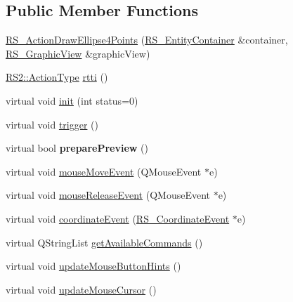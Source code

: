 \subsection*{Public Member Functions}
\begin{DoxyCompactItemize}
\item 
\hyperlink{classRS__ActionDrawEllipse4Points_a68fac043b7bac85718ad61d97c9fea09}{R\-S\-\_\-\-Action\-Draw\-Ellipse4\-Points} (\hyperlink{classRS__EntityContainer}{R\-S\-\_\-\-Entity\-Container} \&container, \hyperlink{classRS__GraphicView}{R\-S\-\_\-\-Graphic\-View} \&graphic\-View)
\item 
\hyperlink{classRS2_afe3523e0bc41fd637b892321cfc4b9d7}{R\-S2\-::\-Action\-Type} \hyperlink{classRS__ActionDrawEllipse4Points_af0df132883d06de0b37e8827175603d7}{rtti} ()
\item 
virtual void \hyperlink{classRS__ActionDrawEllipse4Points_a6df225bb21a5d390207c359cc149db81}{init} (int status=0)
\item 
virtual void \hyperlink{classRS__ActionDrawEllipse4Points_ac181ac7568c462d080c210ffc27c0706}{trigger} ()
\item 
\hypertarget{classRS__ActionDrawEllipse4Points_a1d4ae09ed24ce09570a1c3f81fe836c5}{virtual bool {\bfseries prepare\-Preview} ()}\label{classRS__ActionDrawEllipse4Points_a1d4ae09ed24ce09570a1c3f81fe836c5}

\item 
virtual void \hyperlink{classRS__ActionDrawEllipse4Points_a2bb8a25ac5a15412d816bedc52bbac9b}{mouse\-Move\-Event} (Q\-Mouse\-Event $\ast$e)
\item 
virtual void \hyperlink{classRS__ActionDrawEllipse4Points_ab6668199d0516c5e40e492ec29a40d4d}{mouse\-Release\-Event} (Q\-Mouse\-Event $\ast$e)
\item 
virtual void \hyperlink{classRS__ActionDrawEllipse4Points_a38601beb626f9d9b798ec856ea822659}{coordinate\-Event} (\hyperlink{classRS__CoordinateEvent}{R\-S\-\_\-\-Coordinate\-Event} $\ast$e)
\item 
virtual Q\-String\-List \hyperlink{classRS__ActionDrawEllipse4Points_ab43683c37aefee4a31dfbe6ac14b3b8e}{get\-Available\-Commands} ()
\item 
virtual void \hyperlink{classRS__ActionDrawEllipse4Points_a16e5fd2f64836c377cd6f4bdda9df1bc}{update\-Mouse\-Button\-Hints} ()
\item 
virtual void \hyperlink{classRS__ActionDrawEllipse4Points_a7abe0f6186960595961f7892cefb401d}{update\-Mouse\-Cursor} ()
\end{DoxyCompactItemize}
